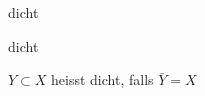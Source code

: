 \documentclass[class=article, crop=false]{standalone}
\begin{document}
\begin{zettel}{dicht}
\begin{flashcard}[jfe213rk]{dicht}
	\begin{definition}[dicht]
		$Y \subset X$ heisst dicht, falls $ \bar{Y} = X$
	\end{definition}
\end{flashcard}
\end{zettel}
\end{document}
